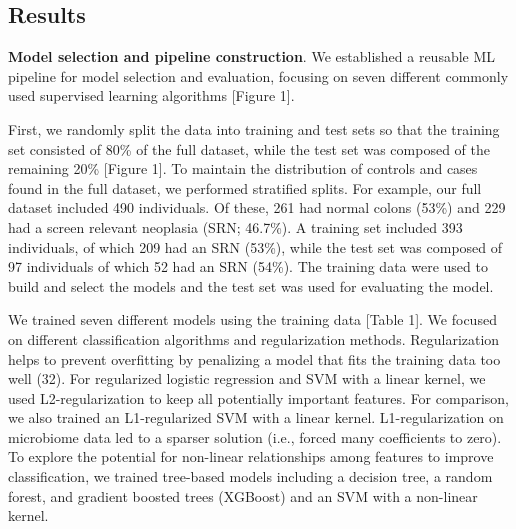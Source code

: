 \documentclass[11pt,]{article}
\begin{document}
\subsection{Results}\label{results}

\textbf{Model selection and pipeline construction}. We established a
reusable ML pipeline for model selection and evaluation, focusing on
seven different commonly used supervised learning algorithms {[}Figure
1{]}.

First, we randomly split the data into training and test sets so that
the training set consisted of 80\% of the full dataset, while the test
set was composed of the remaining 20\% {[}Figure 1{]}. To maintain the
distribution of controls and cases found in the full dataset, we
performed stratified splits. For example, our full dataset included 490
individuals. Of these, 261 had normal colons (53\%) and 229 had a screen
relevant neoplasia (SRN; 46.7\%). A training set included 393
individuals, of which 209 had an SRN (53\%), while the test set was
composed of 97 individuals of which 52 had an SRN (54\%). The training
data were used to build and select the models and the test set was used
for evaluating the model.

We trained seven different models using the training data {[}Table 1{]}.
We focused on different classification algorithms and regularization
methods. Regularization helps to prevent overfitting by penalizing a
model that fits the training data too well (32). For regularized
logistic regression and SVM with a linear kernel, we used
L2-regularization to keep all potentially important features. For
comparison, we also trained an L1-regularized SVM with a linear kernel.
L1-regularization on microbiome data led to a sparser solution (i.e.,
forced many coefficients to zero). To explore the potential for
non-linear relationships among features to improve classification, we
trained tree-based models including a decision tree, a random forest,
and gradient boosted trees (XGBoost) and an SVM with a non-linear
kernel.
\end{document}
